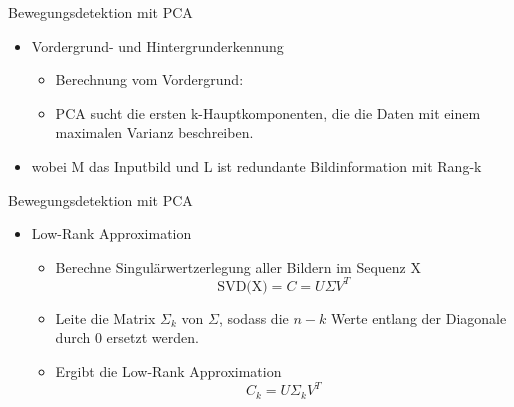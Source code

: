 \begin{frame}[t,fragile]{Bewegungsdetektion mit  PCA}
	\begin{itemize}
 \item Vordergrund- und Hintergrunderkennung
 \begin{itemize}
        \item{Berechnung vom Vordergrund:}
  \item{PCA sucht die ersten k-Hauptkomponenten, die die Daten mit einem maximalen Varianz beschreiben.}
      \end{itemize}

 \item{wobei M das Inputbild und L ist redundante Bildinformation mit Rang-k}
  \end{itemize}
  
\end{frame}


\begin{frame}[t,fragile]{Bewegungsdetektion mit  PCA}
	\begin{itemize}
    \item{Low-Rank Approximation}
\begin{itemize}
    
 \item{Berechne Singulärwertzerlegung aller Bildern im Sequenz X}
 \begin{equation}
\text{SVD(X)}= C = U\Sigma V^T
\end{equation}
 \item{Leite die Matrix ${\Sigma_k}$ von ${\Sigma}$, sodass die ${n - k}$ Werte entlang der Diagonale durch 0 ersetzt werden.}
 \item{Ergibt die Low-Rank Approximation}
\begin{equation}
C_k = U\Sigma_kV^T
\end{equation}

      \end{itemize}
  \end{itemize}
\end{frame}


